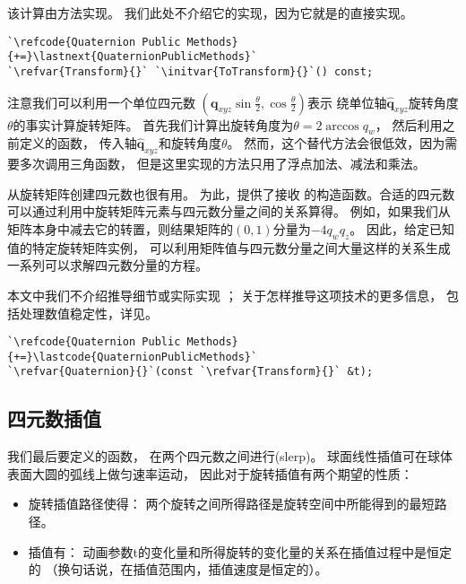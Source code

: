 该计算由方法实现。
我们此处不介绍它的实现，因为它就是的直接实现。
\begin{lstlisting}
`\refcode{Quaternion Public Methods}{+=}\lastnext{QuaternionPublicMethods}`
`\refvar{Transform}{}` `\initvar{ToTransform}{}`() const;
\end{lstlisting}

注意我们可以利用一个单位四元数
$\displaystyle(\bm q_{xyz}\sin\frac{\theta}{2},\cos\frac{\theta}{2})$表示
绕单位轴$\hat{\bm q}_{xyz}$旋转角度$\theta$的事实计算旋转矩阵。
首先我们计算出旋转角度为$\theta=2\arccos q_w$，
然后利用之前定义的函数，
传入轴$\hat{\bm q}_{xyz}$和旋转角度$\theta$。
然而，这个替代方法会很低效，因为需要多次调用三角函数，
但是这里实现的方法只用了浮点加法、减法和乘法。

从旋转矩阵创建四元数也很有用。
为此，提供了接收
的构造函数。合适的四元数可以通过利用中旋转矩阵元素与四元数分量之间的关系算得。
例如，如果我们从矩阵本身中减去它的转置，则结果矩阵的$(0,1)$分量为$-4q_wq_z$。
因此，给定已知值的特定旋转矩阵实例，
可以利用矩阵值与四元数分量之间大量这样的关系生成一系列可以求解四元数分量的方程。

本文中我们不介绍推导细节或实际实现
；
关于怎样推导这项技术的更多信息，
包括处理数值稳定性，详见\citet{SHOEMAKE1991351}。

\begin{lstlisting}
`\refcode{Quaternion Public Methods}{+=}\lastcode{QuaternionPublicMethods}`
`\refvar{Quaternion}{}`(const `\refvar{Transform}{}` &t);
\end{lstlisting}

\subsection{四元数插值}\label{sub:四元数插值}
我们最后要定义的函数，
在两个四元数之间进行(slerp)。
球面线性插值可在球体表面大圆的弧线上做匀速率运动，
因此对于旋转插值有两个期望的性质：
\begin{itemize}
    \item 旋转插值路径使得：
          两个旋转之间所得路径是旋转空间中所能得到的最短路径。
    \item 插值有：
          动画参数{\ttfamily t}的变化量和所得旋转的变化量的关系在插值过程中是恒定的
          （换句话说，在插值范围内，插值速度是恒定的）。
\end{itemize}

